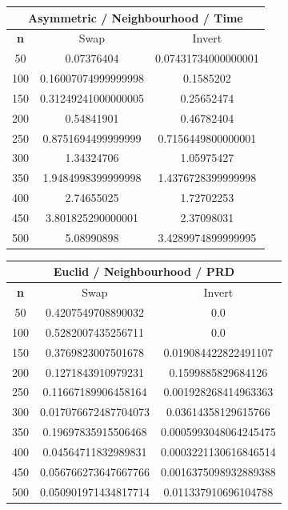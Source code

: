 \documentclass{article}
\begin{document}
\begin{center}
\begin{tabular}{|c|c|c|}
\hline
\multicolumn{3}{|c|}{\textbf{Asymmetric / Neighbourhood / Time}}\\
\hline
\textbf{n} & Swap & Invert\\
\hline
50 & 0.07376404 & 0.07431734000000001\\
\hline
100 & 0.16007074999999998 & 0.1585202\\
\hline
150 & 0.31249241000000005 & 0.25652474\\
\hline
200 & 0.54841901 & 0.46782404\\
\hline
250 & 0.8751694499999999 & 0.7156449800000001\\
\hline
300 & 1.34324706 & 1.05975427\\
\hline
350 & 1.9484998399999998 & 1.4376728399999998\\
\hline
400 & 2.74655025 & 1.72702253\\
\hline
450 & 3.801825290000001 & 2.37098031\\
\hline
500 & 5.08990898 & 3.4289974899999995\\
\hline
\end{tabular}
\end{center}


\begin{center}
\begin{tabular}{|c|c|c|}
\hline
\multicolumn{3}{|c|}{\textbf{Euclid / Neighbourhood / PRD}}\\
\hline
\textbf{n} & Swap & Invert\\
\hline
50 & 0.4207549708890032 & 0.0\\
\hline
100 & 0.5282007435256711 & 0.0\\
\hline
150 & 0.3769823007501678 & 0.019084422822491107\\
\hline
200 & 0.1271843910979231 & 0.1599885829684126\\
\hline
250 & 0.11667189906458164 & 0.001928268414963363\\
\hline
300 & 0.017076672487704073 & 0.03614358129615766\\
\hline
350 & 0.19697835915506468 & 0.0005993048064245475\\
\hline
400 & 0.04564711832989831 & 0.0003221130616846514\\
\hline
450 & 0.056766273647667766 & 0.0016375098932889388\\
\hline
500 & 0.050901971434817714 & 0.011337910696104788\\
\hline
\end{tabular}
\end{center}
\end{document}
